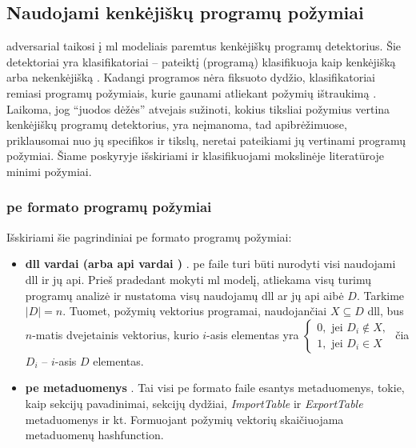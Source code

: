 \subsection{Naudojami kenkėjiškų programų požymiai}\label{sec:literature:features}
\Gls{adversarial} taikosi į \gls{ml} modeliais paremtus kenkėjiškų programų detektorius. Šie detektoriai yra klasifikatoriai -- pateiktį (programą) klasifikuoja kaip kenkėjišką  arba nekenkėjišką . Kadangi programos nėra fiksuoto dydžio, klasifikatoriai remiasi programų požymiais, kurie gaunami atliekant požymių ištraukimą . Laikoma, jog \enquote{juodos dėžės} atvejais sužinoti, kokius tiksliai požymius vertina kenkėjiškų programų detektorius, yra neįmanoma, tad  apibrėžimuose, priklausomai nuo jų specifikos ir tikslų, neretai pateikiami jų vertinami programų požymiai. Šiame poskyryje išskiriami ir klasifikuojami mokslinėje literatūroje minimi požymiai.

\subsubsection{\gls{pe} formato programų požymiai}\label{sec:literature:features:pe}
Išskiriami šie pagrindiniai \gls{pe} formato programų požymiai:
\begin{itemize}
    \item \textbf{\gls{dll} vardai (arba \gls{api} vardai \cite{huGeneratingAdversarialMalware2017})} \cite{zhongMalFoxCamouflagedAdversarial2024}. \gls{pe} faile turi būti nurodyti visi naudojami \gls{dll} ir jų \gls{api}. Prieš pradedant mokyti \gls{ml} modelį, atliekama visų turimų programų analizė ir nustatoma visų naudojamų \gls{dll} ar jų \gls{api} aibė $D$. Tarkime $|D| = n$. Tuomet, požymių vektorius programai, naudojančiai $X \subseteq D$ \gls{dll}, bus $n$-matis dvejetainis vektorius, kurio $i$-asis elementas yra $\begin{cases}
        0, \text{ jei } D_i \not \in X, \\
        1, \text{ jei } D_i \in X
    \end{cases}$ čia $D_i$ -- $i$-asis $D$ elementas.
    \item \textbf{\gls{pe} metaduomenys} \cite{andersonLearningEvadeStatic2018}. Tai visi \gls{pe} formato faile esantys metaduomenys, tokie, kaip sekcijų pavadinimai, sekcijų dydžiai, \textit{ImportTable} ir \textit{ExportTable} metaduomenys ir kt. Formuojant požymių vektorių skaičiuojama metaduomenų \gls{hashfunction}.
\end{itemize}

